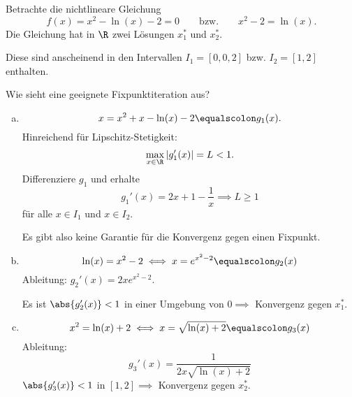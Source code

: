 \bigskip

\begin{bsp}
Betrachte die nichtlineare Gleichung
\begin{equation*}
f(x)=x^2-\operatorname{ln}(x)-2=0
\qquad \text{bzw.} \qquad
x^2-2=\operatorname{ln}(x).
\end{equation*}
Die Gleichung hat in $\R$ zwei Lösungen $x_1^*$ und $x_2^*$.

Diese sind anscheinend in den Intervallen $I_1 = [0,0{,}2]$ bzw. $I_2 = [1,2]$ enthalten.




Wie sieht eine geeignete Fixpunktiteration aus?
\begin{enumerate}[a)]
 \item
  \begin{equation*}
   x=x^2+x-\operatorname{ln}(x)-2\equalscolon g_1(x).
  \end{equation*}
   Hinreichend für Lipschitz-Stetigkeit:
   \begin{equation*}
    \max_{x \in \R} \vert g_1'(x) \vert=L<1.
   \end{equation*}
  Differenziere $g_1$ und erhalte
  \begin{equation*}
   g_1'(x)=2x+1-\frac{1}{x} \implies L \geq 1
  \end{equation*}
  für alle $x \in I_1$ und $x \in I_2$.

  Es gibt also keine Garantie für die Konvergenz gegen einen Fixpunkt.

 \item
  \begin{equation*}
   \operatorname{ln}(x)=x^2-2 \iff x=e^{x^2-2}\equalscolon g_2(x)
  \end{equation*}
  Ableitung: $g_2'(x)=2xe^{x^2-2}$.

  Es ist $\abs{g_2'(x)} <1$ in einer Umgebung von $0 \implies$ Konvergenz gegen $x_1^*$.

 \item
  \begin{equation*}
  x^2=\operatorname{ln}(x)+2 \iff x=\sqrt{\operatorname{ln}(x)+2}\equalscolon g_3(x)
  \end{equation*}
  Ableitung:
  \begin{equation*}
   g_3'(x)=\frac{1}{2x \sqrt{\operatorname{ln}(x)+2}}
  \end{equation*}
  $\abs{g_3'(x)} <1$ in $[1,2] \implies$ Konvergenz gegen $x_2^*$.
\end{enumerate}
\end{bsp}

